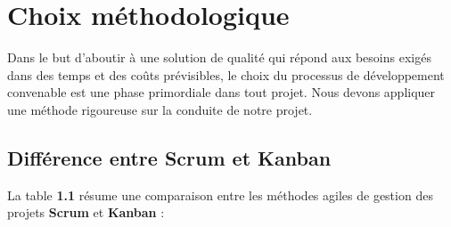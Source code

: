 \section{Choix méthodologique}
\par Dans le but d'aboutir à une solution de qualité qui répond aux besoins exigés dans des
temps et des coûts prévisibles, le choix du processus de développement convenable est
une phase primordiale dans tout projet. Nous devons appliquer une méthode rigoureuse
sur la conduite de notre projet.
\subsection{Différence entre Scrum et Kanban}
\par La table \textbf{1.1} résume une comparaison entre les méthodes agiles de gestion des projets \textbf{Scrum} et \textbf{Kanban} :
